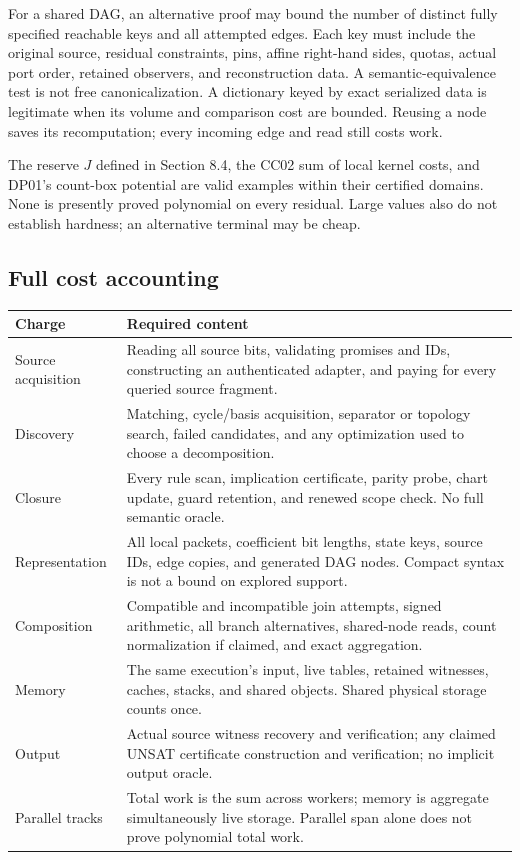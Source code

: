 \documentclass[11pt,letterpaper]{article}
\theoremstyle{definition}
\begin{document}
For a shared DAG, an alternative proof may bound the number of distinct fully specified reachable keys and all attempted edges. Each key must include the original source, residual constraints, pins, affine right-hand sides, quotas, actual port order, retained observers, and reconstruction data. A semantic-equivalence test is not free canonicalization. A dictionary keyed by exact serialized data is legitimate when its volume and comparison cost are bounded. Reusing a node saves its recomputation; every incoming edge and read still costs work.

The reserve $J$ defined in Section 8.4, the CC02 sum of local kernel costs, and DP01's count-box potential are valid examples within their certified domains. None is presently proved polynomial on every residual. Large values also do not establish hardness; an alternative terminal may be cheap.

\subsection{Full cost accounting}

\begin{longtable}{p{}p{}}
\toprule
Charge & Required content\\
\midrule
\endhead
Source acquisition & Reading all source bits, validating promises and IDs, constructing an authenticated adapter, and paying for every queried source fragment.\\
Discovery & Matching, cycle/basis acquisition, separator or topology search, failed candidates, and any optimization used to choose a decomposition.\\
Closure & Every rule scan, implication certificate, parity probe, chart update, guard retention, and renewed scope check. No full semantic oracle.\\
Representation & All local packets, coefficient bit lengths, state keys, source IDs, edge copies, and generated DAG nodes. Compact syntax is not a bound on explored support.\\
Composition & Compatible and incompatible join attempts, signed arithmetic, all branch alternatives, shared-node reads, count normalization if claimed, and exact aggregation.\\
Memory & The same execution's input, live tables, retained witnesses, caches, stacks, and shared objects. Shared physical storage counts once.\\
Output & Actual source witness recovery and verification; any claimed UNSAT certificate construction and verification; no implicit output oracle.\\
Parallel tracks & Total work is the sum across workers; memory is aggregate simultaneously live storage. Parallel span alone does not prove polynomial total work.\\
\bottomrule
\end{longtable}
\end{document}
